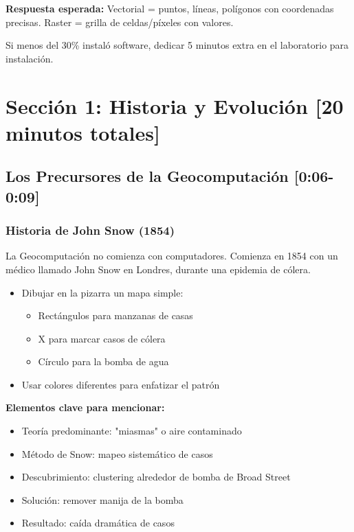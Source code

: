 \documentclass[11pt,a4paper]{article}
\newcommand{\tiempo}[1]{\textcolor{timecolor}{\textbf{[#1]}}}
\newcommand{\decir}[1]{\begin{tcolorbox}[colback=blue!5,colframe=usachblue,title={DECIR}]#1\end{tcolorbox}}
\newcommand{\hacer}[1]{\begin{tcolorbox}[colback=green!5,colframe=green!50!black,title={HACER}]#1\end{tcolorbox}}
\newcommand{\alerta}[1]{\begin{tcolorbox}[colback=red!5,colframe=red,title={ALERTA}]#1\end{tcolorbox}}
\begin{document}
\textbf{Respuesta esperada:} Vectorial = puntos, líneas, polígonos con coordenadas precisas. Raster = grilla de celdas/píxeles con valores.

\alerta{Si menos del 30\% instaló software, dedicar 5 minutos extra en el laboratorio para instalación.}

\newpage

\section{Sección 1: Historia y Evolución \tiempo{20 minutos totales}}

\subsection{Los Precursores de la Geocomputación \tiempo{0:06-0:09}}

\subsubsection{Historia de John Snow (1854)}

\decir{La Geocomputación no comienza con computadores. Comienza en 1854 con un médico llamado John Snow en Londres, durante una epidemia de cólera.}

\hacer{
\begin{itemize}
    \item Dibujar en la pizarra un mapa simple:
    \begin{itemize}
        \item Rectángulos para manzanas de casas
        \item X para marcar casos de cólera
        \item Círculo para la bomba de agua
    \end{itemize}
    \item Usar colores diferentes para enfatizar el patrón
\end{itemize}
}

\textbf{Elementos clave para mencionar:}
\begin{itemize}
    \item Teoría predominante: "miasmas" o aire contaminado
    \item Método de Snow: mapeo sistemático de casos
    \item Descubrimiento: clustering alrededor de bomba de Broad Street
    \item Solución: remover manija de la bomba
    \item Resultado: caída dramática de casos
\end{itemize}
\end{document}
